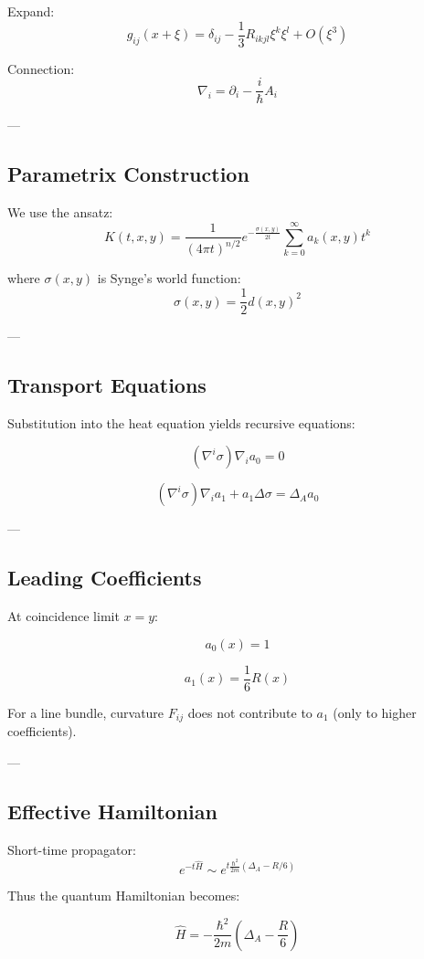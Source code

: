 Expand:
\[
g_{ij}(x+\xi) = \delta_{ij} - \frac{1}{3}R_{ikjl}\xi^k\xi^l + O(\xi^3)
\]

Connection:
\[
\nabla_i = \partial_i - \frac{i}{\hbar} A_i
\]

---

\subsection{Parametrix Construction}

We use the ansatz:
\[
K(t,x,y) =
\frac{1}{(4\pi t)^{n/2}}
e^{-\frac{\sigma(x,y)}{2t}}
\sum_{k=0}^\infty a_k(x,y) t^k
\]

where $\sigma(x,y)$ is Synge's world function:
\[
\sigma(x,y) = \frac{1}{2} d(x,y)^2
\]

---

\subsection{Transport Equations}

Substitution into the heat equation yields recursive equations:

\[
(\nabla^i \sigma)\nabla_i a_0 = 0
\]

\[
(\nabla^i \sigma)\nabla_i a_1 + a_1 \Delta \sigma = \Delta_A a_0
\]

---

\subsection{Leading Coefficients}

At coincidence limit $x=y$:

\[
a_0(x) = 1
\]

\[
a_1(x) = \frac{1}{6} R(x)
\]

\begin{remark}
For a line bundle, curvature $F_{ij}$ does not contribute to $a_1$ (only to higher coefficients).
\end{remark}

---

\subsection{Effective Hamiltonian}

Short-time propagator:
\[
e^{-t\hat{H}} \sim e^{t\frac{\hbar^2}{2m}(\Delta_A - R/6)}
\]

Thus the quantum Hamiltonian becomes:

\[
\boxed{
\hat{H}
=
-\frac{\hbar^2}{2m}
\left(
\Delta_A - \frac{R}{6}
\right)
}
\]

